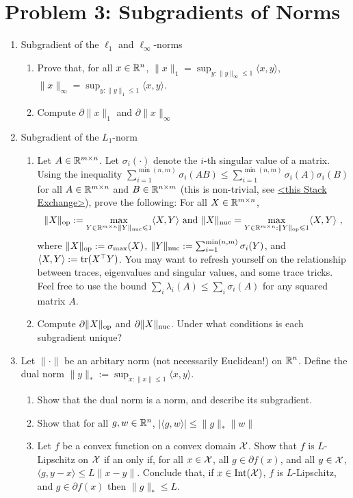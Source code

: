\documentclass[12pt]{article}
\begin{document}
\section*{Problem 3: Subgradients of Norms}
\begin{enumerate}
\item
Subgradient of the $\ell_1$ and $\ell_{\infty}$-norms
\begin{enumerate}
\item
Prove that, for all $x \in \mathbb{R}^n$, $\|x\|_1 = \sup_{y: \|y\|_{\infty} \le 1}\langle x, y \rangle$, $\|x\|_{\infty} = \sup_{y:\|y\|_1 \le 1}\langle x, y \rangle$. 
\item
Compute $\partial \|x\|_1$ and $\partial \|x\|_{\infty}$
\end{enumerate}
\item 
Subgradient of the $L_1$-norm
\begin{enumerate}
\item
Let $A \in \mathbb{R}^{m \times n}$. Let $\sigma_i(\cdot)$ denote the $i$-th singular value of a matrix. Using the inequality $\sum_{i=1}^{\min(n,m)}\sigma_i(AB) \le \sum_{i=1}^{\min(n,m)} \sigma_i(A)\sigma_i(B)$ for all $A \in \mathbb{R}^{m \times n}$ and $B \in \mathbb{R}^{n \times m}$ (this is non-trivial, see \href{<https://math.stackexchange.com/questions/1648542/proving-holders-inequality-for-schatten-norms>}{<this Stack Exchange>}), prove the following: For all $X \in \mathbb{R}^{m \times n}$, 
\begin{eqnarray}
\|X\|_{\mathrm{op}} :=  \max_{Y \in \mathbb{R}^{m \times n}  \|Y\|_{\mathrm{nuc}} \leqslant 1} \langle X, Y \rangle  \text{ and } \|X\|_{\mathrm{nuc}} =  \max_{Y \in \mathbb{R}^{m \times n} :\|Y\|_{\mathrm{op}} \leqslant 1} \langle X, Y \rangle ~,
\end{eqnarray}
where $\|X\|_{\mathrm{op}} := \sigma_{\max}(X)$, $ \|Y\|_{\mathrm{nuc}} := \sum_{i=1}^{\min(n,m)} \sigma_i(Y)$, and $\langle X, Y \rangle := \mathrm{tr}(X^\top Y)$. You may want to refresh yourself on the relationship between traces, eigenvalues and singular values, and some trace tricks. Feel free to use the bound $\sum_{i} \lambda_i (A) \le \sum_i \sigma_i(A)$ for any squared matrix $A$. 
\item
Compute $\partial \|X\|_{\mathrm{op}}$ and $\partial \|X\|_{\mathrm{nuc}}$. Under what conditions is each subgradient unique?
\end{enumerate}
\item 
Let  $\|\cdot\|$ be an arbitary norm (not necessarily Euclidean!)
on $\mathbb{R}^n$. Define the dual norm $\|y\|_* := \sup_{x: \|x\| \le 1}\langle x,y \rangle$. 
\begin{enumerate}
\item
Show that the dual norm is a norm, and describe its subgradient.
\item Show that for all $g,w \in \mathbb{R}^n$, $|\langle g, w \rangle| \le \|g\|_*\|w\|$
\item
Let $f$ be a convex function on a convex domain ${\cal X}$. Show that $f$ is $L$-Lipschitz on ${\cal X}$ if an only if, for all $x \in {\cal X}$, all $g \in \partial f(x)$, and all $y \in {\cal X}$, $\langle g, y-x \rangle \le L\|x-y\|$. Conclude that, if $x \in \mathrm{Int}({\cal X})$, $f$ is $L$-Lipschitz, and $g \in \partial f(x)$ then $\|g\|_* \le L$. 
\end{enumerate}
\end{enumerate}
\end{document}
